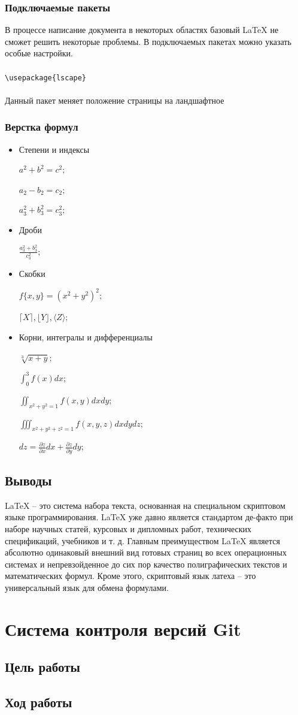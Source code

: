 \documentclass[12pt,a4paper]{article}
\begin{document}
\subsubsection{Подключаемые пакеты}
В процессе написание документа в некоторых областях базовый \LaTeX{} не сможет решить некоторые проблемы. В подключаемых пакетах можно указать особые настройки.
\\\\
\verb+\usepackage{lscape}+
\\\\
Данный пакет меняет положение страницы на ландшафтное

\subsubsection{Верстка формул}
\begin{itemize}
\item Степени и индексы

$a^2+b^2=c^2;$

$a_2-b_2=c_2;$

$a_3^2+b_3^2=c_3^2;$
\item Дроби

$\frac{a_3^2+b_3^2}{c_3^2};$

\item Скобки

$f\{x,y\}=(x^2+y^2)^2 ;$

$\lceil X \rceil, \lfloor Y \rfloor, \langle Z \rangle;$

\item Корни, интегралы и дифференциалы

$\sqrt[3]{x+y};$

$\int_{0}^{3} f(x) dx ;$

$\iint_{x^2 + y^2 = 1} f(x, y) dx dy   ;$

$\iiint_{x^2 + y^2 + z^2 = 1} f(x, y, z) dx dy dz;$

$dz = \frac{\partial z}{\partial x} dx + \frac{\partial z}{\partial y} dy ;$
\end{itemize}

\subsection{Выводы}
\LaTeX{} – это система набора текста, основанная на специальном скриптовом языке программирования. \LaTeX{} уже давно является стандартом де-факто при наборе научных статей, курсовых и дипломных работ, технических спецификаций, учебников и т. д. Главным преимуществом \LaTeX{} является абсолютно одинаковый внешний вид готовых страниц во всех операционных системах и непревзойденное до сих пор качество полиграфических текстов и математических формул. Кроме этого, скриптовый язык латеха – это универсальный язык для обмена формулами.

\newpage
\section{Система контроля версий Git}

\subsection{Цель работы}

\subsection{Ход работы}
\end{document}

